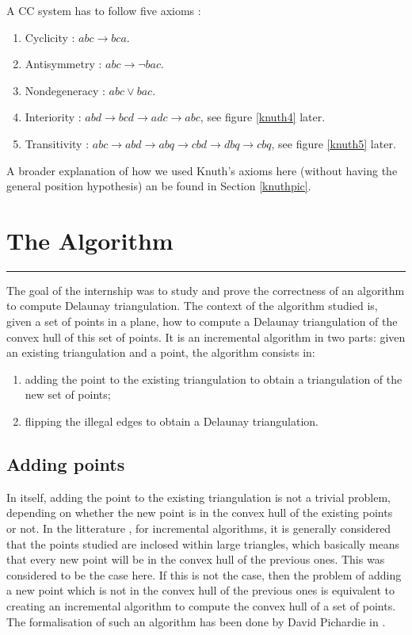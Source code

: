 \documentclass[a4paper,10pt]{article}
\begin{document}
A CC system has to follow five axioms :
\begin{enumerate}
\item Cyclicity : $abc \rightarrow bca$.
\item Antisymmetry : $abc\rightarrow \neg bac$.
\item Nondegeneracy : $abc \vee bac$.
\item Interiority : $abd \rightarrow bcd \rightarrow adc \rightarrow abc$, see figure \ref{knuth4} later.
\item Transitivity : $ abc \rightarrow abd \rightarrow abq \rightarrow cbd \rightarrow dbq \rightarrow cbq $, see figure \ref{knuth5} later.
\end{enumerate}

A broader explanation of how we used Knuth's axioms here (without having the general position hypothesis) an be found in Section \ref{knuthpic}.


\section{The Algorithm}
\label{algo}
\rule{\linewidth}{0.5pt}

The goal of the internship was to study and prove the correctness of an algorithm to compute Delaunay triangulation. The context of the algorithm studied is, given a set of points in a plane, how to compute a Delaunay triangulation of the convex hull of this set of points. It is an incremental algorithm in two parts: given an existing triangulation and a point, the algorithm consists in:
\begin{enumerate}
\item adding the point to the existing triangulation to obtain a triangulation of the new set of points;
\item flipping the illegal edges to obtain a Delaunay triangulation.
\end{enumerate}

\subsection{Adding points}

In itself, adding the point to the existing triangulation is not a trivial problem, depending on whether the new point is in the convex hull of the existing points or not. In the litterature \cite{Del}, for incremental algorithms, it is generally considered that the points studied are inclosed within large triangles, which basically means that every new point will be in the convex hull of the previous ones. This was considered to be the case here. If this is not the case, then the problem of adding a new point which is not in the convex hull of the previous ones is equivalent to creating an incremental algorithm to compute the convex hull of a set of points. The formalisation of such an algorithm has been done by David Pichardie in \cite{Hull}.
\end{document}

